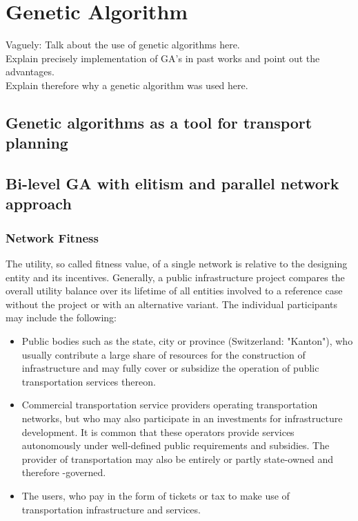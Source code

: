 %
\newpage
\section{Genetic Algorithm} \label{sec:GA}
%
Vaguely:
Talk about the use of genetic algorithms here.\\
Explain precisely implementation of GA's in past works and point out the advantages.\\
Explain therefore why a genetic algorithm was used here.

\subsection{Genetic algorithms as a tool for transport planning}


\subsection{Bi-level GA with elitism and parallel network approach}


\subsubsection{Network Fitness}
The utility, so called fitness value, of a single network is relative to the designing entity and its incentives. Generally, a public infrastructure project compares the overall utility balance over its lifetime of all entities involved to a reference case without the project or with an alternative variant. The individual participants may include the following:

\begin{itemize}
	\item Public bodies such as the state, city or province (Switzerland: "Kanton"), who usually contribute a large share of resources for the construction of infrastructure and may fully cover or subsidize the operation of public transportation services thereon.
	\item Commercial transportation service providers operating transportation networks, but who may also participate in an investments for infrastructure development. It is common that these operators provide services autonomously under well-defined public requirements and subsidies. The provider of transportation may also be entirely or partly state-owned and therefore -governed.
	\item The users, who pay in the form of tickets or tax to make use of transportation infrastructure and services.
\end{itemize}

